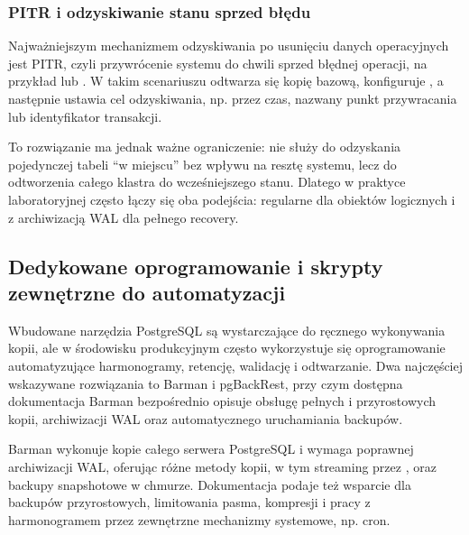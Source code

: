 \documentclass[a4paper,11pt,english,openany,oneside]{sphinxmanual}
\begin{document}
\subsubsection{PITR i odzyskiwanie stanu sprzed błędu}
\label{\detokenize{rozdzial_2/rozdzial_28/index:pitr-i-odzyskiwanie-stanu-sprzed-bledu}}
\sphinxAtStartPar
Najważniejszym mechanizmem odzyskiwania po usunięciu danych operacyjnych jest PITR, czyli przywrócenie systemu do chwili sprzed błędnej operacji, na przykład  lub . W takim scenariuszu odtwarza się kopię bazową, konfiguruje , a następnie ustawia cel odzyskiwania, np. przez czas, nazwany punkt przywracania lub identyfikator transakcji.

\sphinxAtStartPar
To rozwiązanie ma jednak ważne ograniczenie: nie służy do odzyskania pojedynczej tabeli “w miejscu” bez wpływu na resztę systemu, lecz do odtworzenia całego klastra do wcześniejszego stanu. Dlatego w praktyce laboratoryjnej często łączy się oba podejścia: regularne  dla obiektów logicznych i  z archiwizacją WAL dla pełnego recovery.


\subsection{Dedykowane oprogramowanie i skrypty zewnętrzne do automatyzacji}
\label{\detokenize{rozdzial_2/rozdzial_28/index:dedykowane-oprogramowanie-i-skrypty-zewnetrzne-do-automatyzacji}}
\sphinxAtStartPar
Wbudowane narzędzia PostgreSQL są wystarczające do ręcznego wykonywania kopii, ale w środowisku produkcyjnym często wykorzystuje się oprogramowanie automatyzujące harmonogramy, retencję, walidację i odtwarzanie. Dwa najczęściej wskazywane rozwiązania to Barman i pgBackRest, przy czym dostępna dokumentacja Barman bezpośrednio opisuje obsługę pełnych i przyrostowych kopii, archiwizacji WAL oraz automatycznego uruchamiania backupów.

\sphinxAtStartPar
Barman wykonuje kopie całego serwera PostgreSQL i wymaga poprawnej archiwizacji WAL, oferując różne metody kopii, w tym streaming przez ,  oraz backupy snapshotowe w chmurze. Dokumentacja podaje też wsparcie dla backupów przyrostowych, limitowania pasma, kompresji i pracy z harmonogramem przez zewnętrzne mechanizmy systemowe, np. cron.
\end{document}
